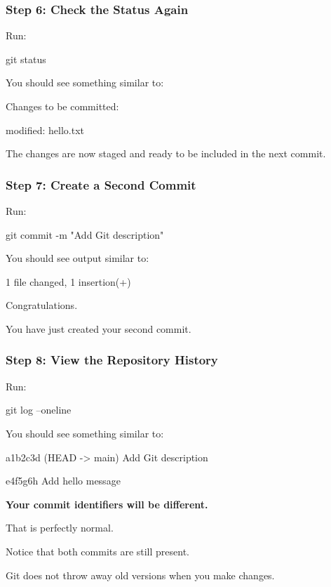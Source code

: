 \documentclass{csc2059practical}
\begin{document}
\subsubsection{Step 6: Check the Status Again}
Run:

\begin{terminalplain}
git status
\end{terminalplain}
You should see something similar to:

\begin{terminalplain}
Changes to be committed:
\end{terminalplain}
\begin{terminalplain}
modified: hello.txt
\end{terminalplain}
The changes are now staged and ready to be included in the next commit.

\subsubsection{Step 7: Create a Second Commit}
Run:

\begin{terminalplain}
git commit -m "Add Git description"
\end{terminalplain}
You should see output similar to:

\begin{terminalplain}
1 file changed, 1 insertion(+)
\end{terminalplain}
Congratulations.

You have just created your second commit.

\subsubsection{Step 8: View the Repository History}
Run:

\begin{terminalplain}
git log --oneline
\end{terminalplain}
You should see something similar to:

\begin{terminalplain}
a1b2c3d (HEAD -> main) Add Git description
\end{terminalplain}
e4f5g6h Add hello message

\textbf{Your commit identifiers will be different.}

That is perfectly normal.

Notice that both commits are still present.

Git does not throw away old versions when you make changes.
\end{document}
